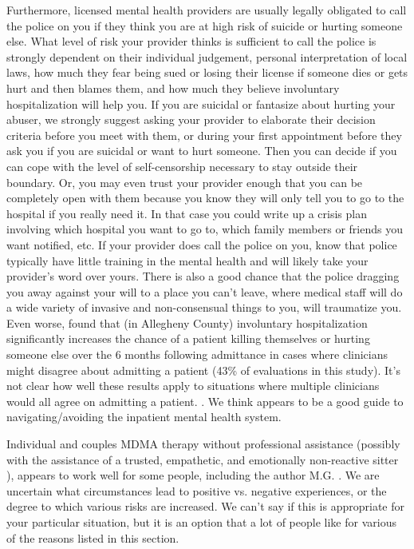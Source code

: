 \documentclass[12pt,letterpaper]{book}
\begin{document}
Furthermore, licensed mental health providers are usually legally obligated to call the police on you if they think you are at high risk of suicide or hurting someone else. What level of risk your provider thinks is sufficient to call the police is strongly dependent on their individual judgement, personal interpretation of local laws, how much they fear being sued or losing their license if someone dies or gets hurt and then blames them, and how much they believe involuntary hospitalization will help you. If you are suicidal or fantasize about hurting your abuser, we strongly suggest asking your provider to elaborate their decision criteria before you meet with them, or during your first appointment before they ask you if you are suicidal or want to hurt someone. Then you can decide if you can cope with the level of self-censorship necessary to stay outside their boundary. Or, you may even trust your provider enough that you can be completely open with them because you know they will only tell you to go to the hospital if you really need it. In that case you could write up a crisis plan involving which hospital you want to go to, which family members or friends you want notified, etc. If your provider does call the police on you, know that police typically have little training in the mental health and will likely take your provider's word over yours. There is also a good chance that the police dragging you away against your will to a place you can't leave, where medical staff will do a wide variety of invasive and non-consensual things to you, will traumatize you. Even worse, \textcite{emanuelHospitalization} found that (in Allegheny County) involuntary hospitalization significantly increases the chance of a patient killing themselves or hurting someone else over the 6 months following admittance in cases where clinicians might disagree about admitting a patient (43\% of evaluations in this study). It's not clear how well these results apply to situations where multiple clinicians would all agree on admitting a patient. \cite{emanuelHospitalization}. We think \textcite{alexanderInpatient} appears to be a good guide to navigating/avoiding the inpatient mental health system.

Individual and couples MDMA therapy without professional assistance (possibly with the assistance of a trusted, empathetic, and emotionally non-reactive sitter \cite{thalSitter}), appears to work well for some people, including the author M.G. \cite{hillsSolo,colbertEvenings}. We are uncertain what circumstances lead to positive vs. negative experiences, or the degree to which various risks are increased. We can't say if this is appropriate for your particular situation, but it is an option that a lot of people like for various of the reasons listed in this section.
\end{document}
